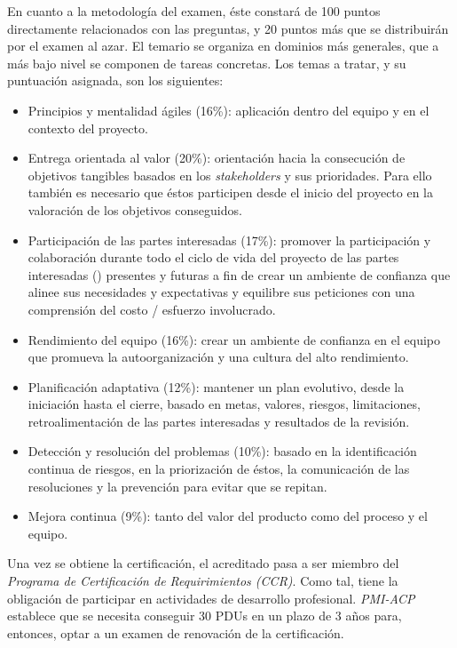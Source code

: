 En cuanto a la metodología del examen, éste constará de 100 puntos directamente relacionados con las preguntas, y 20 puntos más que se distribuirán por el examen al azar. El temario se organiza en dominios más generales, que a más bajo nivel se componen de tareas concretas. Los temas a tratar, y su puntuación asignada, son los siguientes:
\begin{itemize}
	\item Principios y mentalidad ágiles (16\%): aplicación dentro del equipo y en el contexto del proyecto.
	\item Entrega orientada al valor (20\%): orientación hacia la consecución de objetivos tangibles basados en los \emph{stakeholders} y sus prioridades. Para ello también es necesario que éstos participen desde el inicio del proyecto en la valoración de los objetivos conseguidos.
	\item Participación de las partes interesadas (17\%): promover la participación y colaboración durante todo el ciclo de vida del proyecto de las partes interesadas () presentes y futuras a fin de crear un ambiente de confianza que alinee sus necesidades y expectativas y equilibre sus peticiones con una comprensión del costo / esfuerzo involucrado.
	\item Rendimiento del equipo (16\%): crear un ambiente de confianza en el equipo que promueva la autoorganización y una cultura del alto rendimiento.
	\item Planificación adaptativa (12\%): mantener un plan evolutivo, desde la iniciación hasta el cierre, basado en metas, valores, riesgos, limitaciones, retroalimentación de las partes interesadas y resultados de la revisión.
	\item Detección y resolución del problemas (10\%): basado en la identificación continua de riesgos, en la priorización de éstos, la comunicación de las resoluciones y la prevención para evitar que se repitan.
	\item Mejora continua (9\%): tanto del valor del producto como del proceso y el equipo.
\end{itemize}

Una vez se obtiene la certificación, el acreditado pasa a ser miembro del \emph{Programa de Certificación de Requirimientos (CCR)}. Como tal, tiene la obligación de participar en actividades de desarrollo profesional. \emph{PMI-ACP} establece que se necesita conseguir 30 PDUs en un plazo de 3 años para, entonces, optar a un examen de renovación de la certificación.\\

